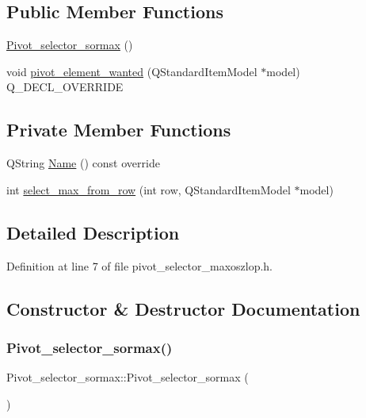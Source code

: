 \subsection*{Public Member Functions}
\begin{DoxyCompactItemize}
\item 
\hyperlink{classPivot__selector__sormax_a856531405fd1d1e2d205dd721fd507c3}{Pivot\+\_\+selector\+\_\+sormax} ()
\item 
void \hyperlink{classPivot__selector__sormax_acfb3f057c0d2dd29b33ef23d547dfe36}{pivot\+\_\+element\+\_\+wanted} (Q\+Standard\+Item\+Model $\ast$model) Q\+\_\+\+D\+E\+C\+L\+\_\+\+O\+V\+E\+R\+R\+I\+DE
\end{DoxyCompactItemize}
\subsection*{Private Member Functions}
\begin{DoxyCompactItemize}
\item 
Q\+String \hyperlink{classPivot__selector__sormax_a72875b6810a0f83c77ff2abde1b186a4}{Name} () const override
\item 
int \hyperlink{classPivot__selector__sormax_ae4cc8a14537453cb9bd890500dd72d01}{select\+\_\+max\+\_\+from\+\_\+row} (int row, Q\+Standard\+Item\+Model $\ast$model)
\end{DoxyCompactItemize}


\subsection{Detailed Description}


Definition at line 7 of file pivot\+\_\+selector\+\_\+maxoszlop.\+h.



\subsection{Constructor \& Destructor Documentation}
\mbox{\label{classPivot__selector__sormax_a856531405fd1d1e2d205dd721fd507c3}} 
\subsubsection{\texorpdfstring{Pivot\+\_\+selector\+\_\+sormax()}{Pivot\_selector\_sormax()}}
{\footnotesize\ttfamily Pivot\+\_\+selector\+\_\+sormax\+::\+Pivot\+\_\+selector\+\_\+sormax (\begin{DoxyParamCaption}{ }\end{DoxyParamCaption})\hspace{0.3cm}{\ttfamily [default]}}




